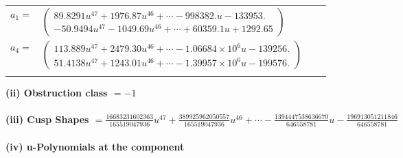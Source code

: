 \documentclass[1p]{elsarticle_modified}
\theoremstyle{definition}
\begin{document}
\begin{tabular}{m{7pt} m{180pt} m{7pt} m{180pt} }
\flushright $a_{1}=$&$\begin{pmatrix}89.8291 u^{47}+1976.87 u^{46}+\cdots-998382. u-133953.\\-50.9494 u^{47}-1049.69 u^{46}+\cdots+60359.1 u+1292.65\end{pmatrix}$ \\
\flushright $a_{4}=$&$\begin{pmatrix}113.889 u^{47}+2479.30 u^{46}+\cdots-1.06684\times10^{6} u-139256.\\51.4138 u^{47}+1243.01 u^{46}+\cdots-1.39957\times10^{6} u-199576.\end{pmatrix}$\\&\end{tabular}
\flushleft \textbf{(ii) Obstruction class $= -1$}\\~\\
\flushleft \textbf{(iii) Cusp Shapes $= \frac{16683231602363}{165519047936} u^{47}+\frac{389925962050557}{165519047936} u^{46}+\cdots-\frac{1394447538636670}{646558781} u-\frac{196913051211846}{646558781}$}\\~\\
\newpage\renewcommand{\arraystretch}{1}
\flushleft \textbf{(iv) u-Polynomials at the component}\newline \\
\end{document}
